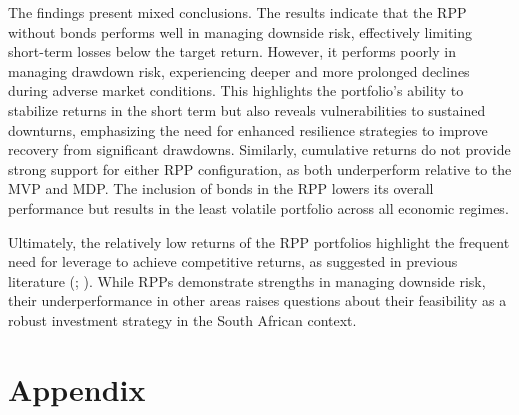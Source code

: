 \documentclass[11pt,preprint]{elsarticle}
\numberwithin{equation}{section}
\numberwithin{figure}{section}
\numberwithin{table}{section}
\begin{document}
The findings present mixed conclusions. The results indicate that the
RPP without bonds performs well in managing downside risk, effectively
limiting short-term losses below the target return. However, it performs
poorly in managing drawdown risk, experiencing deeper and more prolonged
declines during adverse market conditions. This highlights the
portfolio's ability to stabilize returns in the short term but also
reveals vulnerabilities to sustained downturns, emphasizing the need for
enhanced resilience strategies to improve recovery from significant
drawdowns. Similarly, cumulative returns do not provide strong support
for either RPP configuration, as both underperform relative to the MVP
and MDP. The inclusion of bonds in the RPP lowers its overall
performance but results in the least volatile portfolio across all
economic regimes.

Ultimately, the relatively low returns of the RPP portfolios highlight
the frequent need for leverage to achieve competitive returns, as
suggested in previous literature (; ). While RPPs demonstrate strengths in managing
downside risk, their underperformance in other areas raises questions
about their feasibility as a robust investment strategy in the South
African context.

\section{Appendix}\label{appendix}
\end{document}
